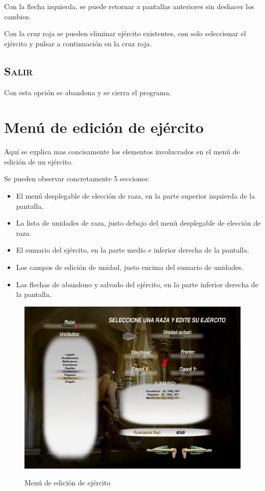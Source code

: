 Con la flecha izquierda, se puede
retornar a pantallas anteriores sin deshacer los cambios.

Con la cruz roja se pueden eliminar ejército existentes, con solo
seleccionar el ejército y pulsar a continuación en la cruz roja.

\subsection*{\textsc{Salir}}
Con esta opción se abandona \gom y se cierra el programa.

\section*{Menú de edición de ejército}
Aquí se explica mas concisamente los elementos involucrados en el menú
de edición de un ejército.

Se pueden observar concretamente 5 secciones:
\begin{itemize}
\item El menú desplegable de elección de raza, en la parte
  superior izquierda de la pantalla.
\item La lista de unidades de raza, justo debajo del menú desplegable
  de elección de raza.
\item El sumario del ejército, en la parte medio e inferior derecha de
  la pantalla.
\item Los campos de edición de unidad, justo encima del sumario de
  unidades.
\item Las flechas de abandono y salvado del ejército, en la parte inferior
  derecha de la pantalla.
\end{itemize}

\begin{figure}[h]
\centering
\includegraphics[scale=.4]{./imagenes/configurarejercito.png}
\label{fig:confejercito}
\caption{Menú de edición de ejército}
\end{figure}

